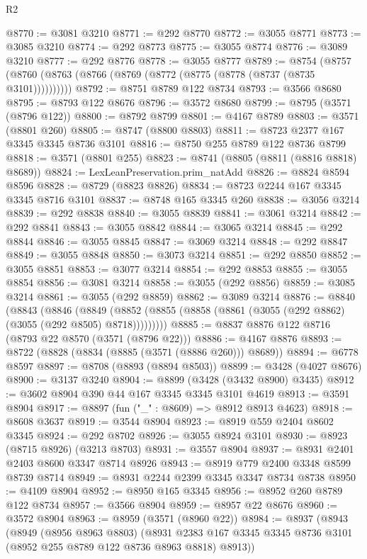 \begin{lexlean}{R2}
\begin{coremodule}
@8770 := @3081 @3210
@8771 := @292 @8770
@8772 := @3055 @8771
@8773 := @3085 @3210
@8774 := @292 @8773
@8775 := @3055 @8774
@8776 := @3089 @3210
@8777 := @292 @8776
@8778 := @3055 @8777
@8789 := @8754 (@8757 (@8760 (@8763 (@8766 (@8769 (@8772 (@8775 (@8778 (@8737 (@8735 @3101))))))))))
@8792 := @8751 @8789 @122 @8734
@8793 := @3566 @8680
@8795 := @8793 @122 @8676
@8796 := @3572 @8680
@8799 := @8795 (@3571 (@8796 @122))
@8800 := @8792 @8799
@8801 := @4167 @8789
@8803 := @3571 (@8801 @260)
@8805 := @8747 (@8800 @8803)
@8811 := @8723 @2377 @167 @3345 @3345 @8736 @3101
@8816 := @8750 @255 @8789 @122 @8736 @8799
@8818 := @3571 (@8801 @255)
@8823 := @8741 (@8805 (@8811 (@8816 @8818) @8689))
@8824 := LexLeanPreservation.prim_natAdd
@8826 := @8824 @8594 @8596
@8828 := @8729 (@8823 @8826)
@8834 := @8723 @2244 @167 @3345 @3345 @8716 @3101
@8837 := @8748 @165 @3345 @260
@8838 := @3056 @3214
@8839 := @292 @8838
@8840 := @3055 @8839
@8841 := @3061 @3214
@8842 := @292 @8841
@8843 := @3055 @8842
@8844 := @3065 @3214
@8845 := @292 @8844
@8846 := @3055 @8845
@8847 := @3069 @3214
@8848 := @292 @8847
@8849 := @3055 @8848
@8850 := @3073 @3214
@8851 := @292 @8850
@8852 := @3055 @8851
@8853 := @3077 @3214
@8854 := @292 @8853
@8855 := @3055 @8854
@8856 := @3081 @3214
@8858 := @3055 (@292 @8856)
@8859 := @3085 @3214
@8861 := @3055 (@292 @8859)
@8862 := @3089 @3214
@8876 := @8840
    (@8843
      (@8846
        (@8849 (@8852 (@8855 (@8858 (@8861 (@3055 (@292 @8862) (@3055 (@292 @8505) @8718)))))))))
@8885 := @8837 @8876 @122 @8716 (@8793 @22 @8570 (@3571 (@8796 @22)))
@8886 := @4167 @8876
@8893 := @8722 (@8828 (@8834 (@8885 (@3571 (@8886 @260))) @8689))
@8894 := @6778 @8597
@8897 := @8708 (@8893 (@8894 @8503))
@8899 := @3428 (@4027 @8676)
@8900 := @3137 @3240
@8904 := @8899 (@3428 (@3432 @8900) @3435)
@8912 := @3602 @8904 @390 @44 @167 @3345 @3345 @3101 @4619
@8913 := @3591 @8904
@8917 := @8897 (fun ("_" : @8609) => @8912 @8913 @4623)
@8918 := @8608 @3637
@8919 := @3544 @8904
@8923 := @8919 @559 @2404 @8602 @3345
@8924 := @292 @8702
@8926 := @3055 @8924 @3101
@8930 := @8923 (@8715 @8926) (@3213 @8703)
@8931 := @3557 @8904
@8937 := @8931 @2401 @2403 @8600 @3347 @8714 @8926
@8943 := @8919 @779 @2400 @3348 @8599 @8739 @8714
@8949 := @8931 @2244 @2399 @3345 @3347 @8734 @8738
@8950 := @4109 @8904
@8952 := @8950 @165 @3345
@8956 := @8952 @260 @8789 @122 @8734
@8957 := @3566 @8904
@8959 := @8957 @22 @8676
@8960 := @3572 @8904
@8963 := @8959 (@3571 (@8960 @22))
@8984 := @8937
    (@8943
      (@8949
        (@8956 @8963 @8803)
        (@8931 @2383 @167 @3345 @3345 @8736 @3101 (@8952 @255 @8789 @122 @8736 @8963 @8818) @8913))

\end{coremodule}
\end{lexlean}
